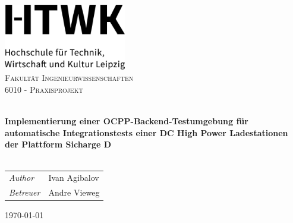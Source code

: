\begin{titlepage}
    \vbox{}
    \vbox{}
    \begin{center}
        \includegraphics[width=0.40\textwidth,center]{Images/HTWK_Zusatz_de_V_Black.jpg}\\[1cm]
        \textsc{\LARGE Fakultät Ingenieurwissenschaften}\\[1.5cm]
        \textsc{\Large 6010 - Praxisprojekt}\\[0.5cm]
        \vbox{ }

        \HRule \\[0.4cm]
        { \huge \bfseries Implementierung einer OCPP-Backend-Testumgebung für automatische 
        Integrationstests einer DC High Power Ladestationen der Plattform Sicharge D}\\[0.4cm]
        \HRule \\[1.5cm]

        \begin{table}[h]
            \large
                \centering
                \begin{tabular}{ll}
                    \emph{Author} & Ivan Agibalov \\
                    \emph{Betreuer} & Andre Vieweg
                \end{tabular}
            \end{table}
            \vfill
            {\large \today}
    \end{center}
\end{titlepage}